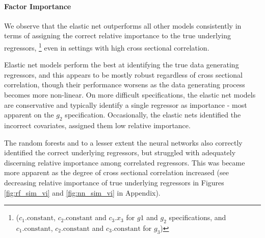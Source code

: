 \documentclass{article}
\begin{document}
\paragraph{Factor Importance}
We observe that the elastic net outperforms all other models consistently in terms of assigning the correct relative importance to the true underlying regressors, \footnote{($c_1.\text{constant}$, $c_2.\text{constant}$ and $c_3.x_3$ for $g1$ and $g_2$ specifications, and $c_1.\text{constant}$, $c_2.\text{constant}$ and $c_3.\text{constant}$ for $g_3$)} even in settings with high cross sectional correlation. 

Elastic net models perform the best at identifying the true data generating regressors, and  this appears to be mostly robust regardless of cross sectional correlation, though their performance worsens as the data generating process becomes more non-linear. On more difficult specifications, the elastic net models are conservative and typically identify a single regressor as importance - most apparent on the $g_2$ specification. Occasionally, the elastic nets identified the incorrect covariates, assigned them low relative importance.

The random forests and to a lesser extent the neural networks also correctly identified the correct underlying regressors, but struggled with adequately discerning relative importance among correlated regressors. This was became more apparent as the degree of cross sectional correlation increased (see decreasing relative importance of true underlying regressors in Figures \ref{fig:rf_sim_vi} and \ref{fig:nn_sim_vi} in Appendix). 

\end{document}
